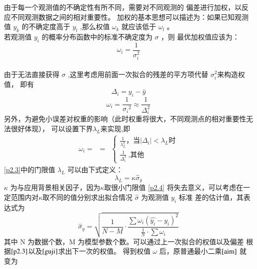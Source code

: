 \documentclass[UTF8]{ctexart}
\begin{document}
    由于每一个观测值的不确定性有所不同，需要对不同观测的
    偏差进行加权\cite{zhuangshijian}，以反应不同观测数据之间的相对重要性。
    加权的基本思想可以描述为：如果已知观测值 $y_k$ 的不确定度高于
     $y_l$ ,那么权值 $\omega_k$ 就应该低于 $\omega_l$ 。\cite{key}
    \\
    若观测值 $y_i$ 的概率分布函数中的标准不确定度为 $\sigma$ ，则
    最优加权值应该为：
     $$\omega_i=\frac{1}{\sigma_i ^2}$$
    \\
    由于无法直接获得 $\sigma$ ,这里考虑用前面一次拟合的残差的平方项代替 $\sigma_i^2$来构造权值，
    即有
    $$ \Delta_i =y_i-\hat{y} $$
    $$\omega_i=\frac{1}{{\sigma_i}^2}\approx \frac{1}{\Delta _i^2} $$
    另外，为避免小误差对权重的影响（此时权重将很大，不同观测点的相对重要性无法很好体现），
    可以设置下界$\lambda_L$来实现\cite{key},即
    \begin{eqnarray} %
      \omega_i=&=&%
      \left\{
      \begin{array}{lll}\label{p2.3}
         \frac{1}{\lambda_L^2}
    \mbox{，当} |\Delta_i|<\lambda_L \mbox{时}\\
     \frac{1}{\Delta_i^2} \ \mbox{,其他}
      \end{array}\right. 
    \end{eqnarray}
    \ref{p2.3}中的门限值 $\lambda_L$ 可以由下式定义：\cite{key}
    \begin{equation}\label{p2.4}
      \lambda_L=\kappa\hat{\sigma}_y
    \end{equation}
    $\kappa$ 为与应用背景相关因子，因为$\kappa$取很小门限值 \ref{p2.4} 
    将失去意义，可以考虑在一定范围内对$\kappa$取不同的值分别求出拟合情况
    $\hat{\sigma}$ 为观测值 $y_i$ 标准
    差的估计值，其表达式为
    \begin{equation}\label{guji}
       \hat{\sigma}_y=\sqrt{\frac{1}{N-M}\cdot\frac{\sum
    \omega_i(\hat{y_i}-y_i)^2}{\frac{1}{N}\cdot \sum{\omega_i}}}
    \end{equation}
    其中 N 为数据个数，M 为模型参数个数。可以通过上一次拟合的权值以及偏差
    根据$\ref{p2.3}$以及$\ref{guji}$求出下一次的权值。
    得到权值 $\omega$ 后，原普通最小二乘$\ref{aim}$ 就变为
\end{document}

